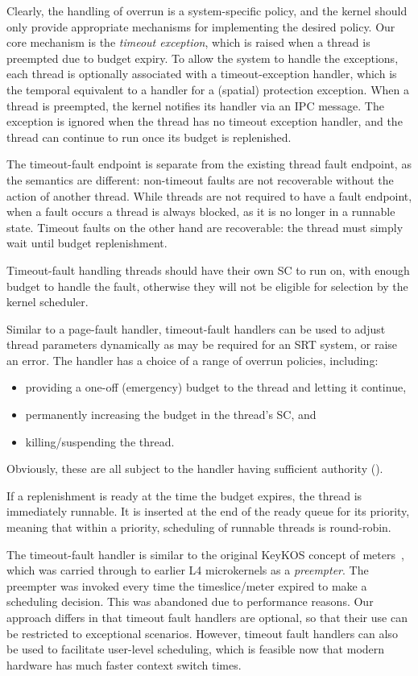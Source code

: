 Clearly, the handling of overrun is a system-specific policy, and the
kernel should only provide appropriate
mechanisms for implementing the desired policy. Our core mechanism is
the \emph{timeout exception}, which is raised when a thread is
preempted due to budget expiry. To allow the system to handle the exceptions, each thread
is optionally associated with a timeout-exception handler, which is
the temporal equivalent to a handler for a (spatial) protection exception. When a
thread is preempted, the kernel notifies its handler via an \gls{IPC} message. The
exception is ignored when the thread has no timeout exception handler, and the thread
can continue to run once its budget is replenished.

The timeout-fault
endpoint is separate from the existing thread fault endpoint, as the semantics are different:
non-timeout faults are not recoverable without the action of another thread. 
While threads are not required to have a fault endpoint, when a fault occurs a thread is always
blocked, as it is no longer in a runnable state. Timeout faults on the other hand are recoverable:
the thread must simply wait until budget replenishment. 

Timeout-fault handling threads should have their own \gls{SC} to run on, with enough budget to handle
the fault, otherwise they will not be eligible for selection by the kernel scheduler.

Similar to a page-fault handler, timeout-fault handlers can be used to adjust thread parameters
dynamically as may be required for an \gls{SRT} system, or raise an error.
The handler has a choice of a range of overrun policies, including:
\begin{itemize}
      \item providing a one-off (emergency) budget to the thread and letting it continue,
       \item permanently increasing the budget in the thread's SC, and
       \item killing/suspending the thread.
       \end{itemize}
Obviously, these are all subject to the handler having sufficient
authority (\eg \schedcontrol).

If a replenishment is ready at the time the budget expires, the thread
is immediately runnable. It is inserted at the end of the ready queue
for its priority, meaning that within a priority, scheduling of
runnable threads is round-robin.

The timeout-fault handler is similar to the original KeyKOS concept of
meters~\citep{Bomberger_FFHLS_92},
which was carried through to earlier L4 microkernels as a \emph{preempter}. The preempter was
invoked every time the timeslice/meter expired to make a scheduling decision. This was abandoned due
to performance reasons. Our approach differs in that timeout fault handlers are optional, so that
their use can be restricted to exceptional scenarios. However, timeout fault handlers can also be used to
facilitate user-level scheduling, which is feasible now that modern hardware has much faster context
switch times. 

